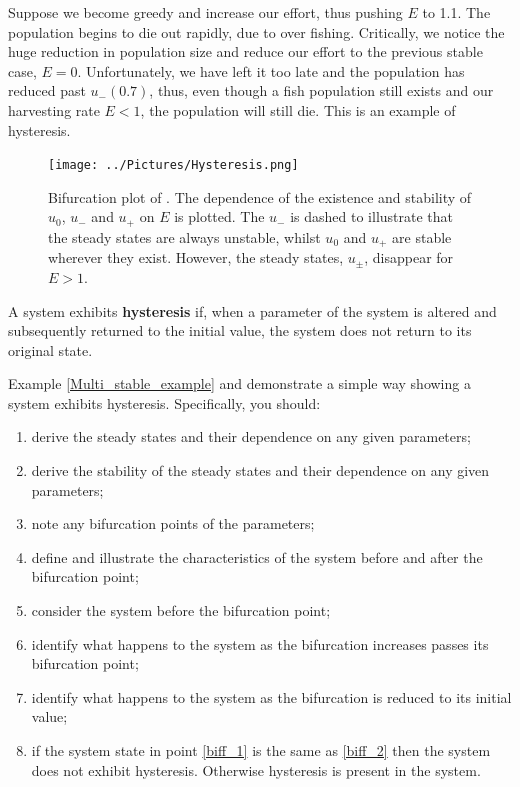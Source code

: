 Suppose we become greedy and increase our effort, thus pushing $E$ to 1.1. The population begins to die out rapidly, due to over fishing. Critically, we notice the huge reduction in population size and reduce our effort to the previous stable case, $E=0$. Unfortunately, we have left it too late and the population has reduced past $u_-(0.7)$, thus, even though a fish population still exists and our harvesting rate $E<1$, the population will still die. This is an example of hysteresis.
\begin{figure}[!!!h!!!tb]
\centering
\texttt{[image: ../Pictures/Hysteresis.png]}
\caption{ \label{Hysteresis_figure}Bifurcation plot of . The dependence of the existence and stability of $u_0$, $u_-$ and $u_+$ on $E$ is plotted. The $u_-$ is dashed to illustrate that the steady states are always unstable, whilst $u_0$ and $u_+$ are stable wherever they exist. However, the steady states, $u_\pm$, disappear for $E>1$.}
\end{figure}
\begin{defin}
A system exhibits \textbf{hysteresis} if, when a parameter of the system is altered and subsequently returned to the initial value, the system does not return to its original state.
\end{defin}

Example \ref{Multi_stable_example} and  demonstrate a simple way showing a system exhibits hysteresis. Specifically, you should:
\begin{enumerate}
\item derive the steady states and their dependence on any given parameters;
\item derive the stability of the  steady states and their dependence on any given parameters;
\item note any bifurcation points of the parameters;
\item define and illustrate the characteristics of the system before and after the bifurcation point;
\item consider the system before the bifurcation point;\label{biff_1}
\item identify what happens to the system as the bifurcation increases passes its bifurcation point;
\item identify what happens to the system as the bifurcation is reduced to its initial value;\label{biff_2}
\item if the system state in point \ref{biff_1} is the same as \ref{biff_2} then the system does not exhibit hysteresis. Otherwise hysteresis is present in the system.
\end{enumerate}


